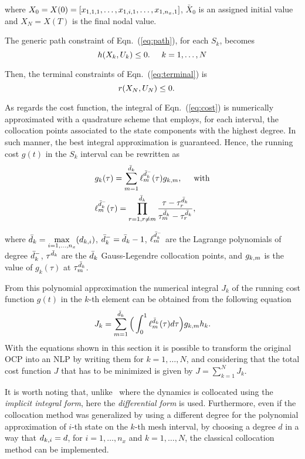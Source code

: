 where $X_0 = X(0) = [x_{1,1,1}, \dots, x_{1,i,1}, \dots, x_{1,n_{x},1}]$, $\bar{X}_{0}$ is an assigned initial value and $X_{N} = X(T)$ is the final nodal value.


The generic path constraint of Eqn.~(\ref{eq:path}), for each $S_k$, becomes
\begin{equation}\label{eq:nlpath}
h(X_k, U_k) \leq 0. \hspace{5mm} k = 1, \dots, N
\end{equation}

Then, the terminal constraints of Eqn.~(\ref{eq:terminal}) is
\begin{equation}\label{eq:npterminal}
	r(X_N, U_N) \leq 0. \hspace{5mm}
\end{equation}

As regards the cost function, the integral of Eqn.~(\ref{eq:cost}) is numerically approximated with a quadrature scheme that employs, for each interval, the collocation points associated to the state components with the highest degree. In such manner, the best integral approximation is guaranteed. Hence, the running cost $g(t)$ in the $S_k$ interval can be rewritten as
\begin{subequations}
	\begin{align}
	& g_k(\tau) = \sum_{m=1}^{\bar{d}_k} \ell_{m}^{\bar{d}_{k}^{-}}(\tau)g_{k,m}, \hspace{5mm} \text{with} \label{eq:nlpcost}\\
	&  \ell_{m}^{\bar{d}_{k}^{-}} (\tau) = \prod_{r=1, r\neq m}^{\bar{d}_k} \dfrac{\tau - \tau^{\bar{d}_{k}}_{r}}{\tau^{\bar{d}_{k}}_{m} - \tau^{\bar{d}_{k}}_{r}}, \label{eq:nlplm}
	\end{align}
\end{subequations}

where $\bar{d}_k = \max\limits_{i= 1, \dots, n_x}(d_{k,i})$, $\bar{d}_k^{-} = \bar{d}_k -1$, $\ell_{m}^{\bar{d}_{k}^{-}}$ are the Lagrange polynomials of degree $\bar{d}_k^{-}$, $\tau^{\bar{d}_{k}}$ are the $\bar{d}_k$ Gauss-Legendre collocation points, and $g_{k,m}$ is the value of $g_k (\tau)$ at $\tau^{\bar{d}_{k}}_{m}$.

From this polynomial approximation the numerical integral $J_k$ of the running cost function $g(t)$ in the $k$-th element can be obtained from the following equation
\begin{equation}\label{eq:nlpcostk}
	J_k = \sum_{m=1}^{\bar{d}_k}\Big(\int_{0}^{1}\ell_{m}^{\bar{d}_{k}}(\tau)d\tau\Big)g_{k,m} h_{k}.
\end{equation}
With the equations shown in this section it is possible to transform the original OCP into an NLP by writing them for $k = 1, \dots, N$, and considering that the total cost function $J$ that has to be minimized is given by $J = \sum_{k=1}^{N}J_k$.

It is worth noting that, unlike~\cite{Patterson:OCAM:2015} where the dynamics is collocated using the \emph{implicit integral form}, here the \emph{differential form} is used.
Furthermore, even if the collocation method was generalized by using a different degree for the polynomial approximation of $i$-th state on the $k$-th mesh interval, by choosing a degree $d$ in a way that $d_{k,i} = d$, for $i = 1, \dots, n_x$ and $k = 1, \dots, N$, the classical collocation method can be implemented.
